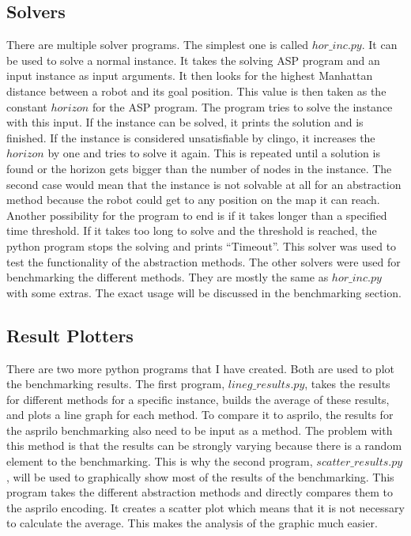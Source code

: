 \documentclass[runningheads]{llncs}
\begin{document}
\subsection{Solvers}
There are multiple solver programs. The simplest one is called $hor\_inc.py$. It can be used to solve a normal instance. It takes the solving ASP program and an input instance as input arguments. It then looks for the highest Manhattan distance between a robot and its goal position. This value is then taken as the constant $horizon$ for the ASP program. The program tries to solve the instance with this input. If the instance can be solved, it prints the solution and is finished. If the instance is considered unsatisfiable by clingo, it increases the $horizon$ by one and tries to solve it again. This is repeated until a solution is found or the horizon gets bigger than the number of nodes in the instance. The second case would mean that the instance is not solvable at all for an abstraction method because the robot could get to any position on the map it can reach. Another possibility for the program to end is if it takes longer than a specified time threshold. If it takes too long to solve and the threshold is reached, the python program stops the solving and prints ``Timeout''. This solver was used to test the functionality of the abstraction methods. The other solvers were used for benchmarking the different methods. They are mostly the same as $hor\_inc.py$ with some extras. The exact usage will be discussed in the benchmarking section.
\subsection{Result Plotters}
There are two more python programs that I have created. Both are used to plot the benchmarking results. The first program, $lineg\_results.py$, takes the results for different methods for a specific instance, builds the average of these results, and plots a line graph for each method. To compare it to asprilo, the results for the asprilo benchmarking also need to be input as a method. The problem with this method is that the results can be strongly varying because there is a random element to the benchmarking. This is why the second program, $scatter\_results.py$, will be used to graphically show most of the results of the benchmarking. This program takes the different abstraction methods and directly compares them to the asprilo encoding. It creates a scatter plot which means that it is not necessary to calculate the average. This makes the analysis of the graphic much easier.  
\end{document}
